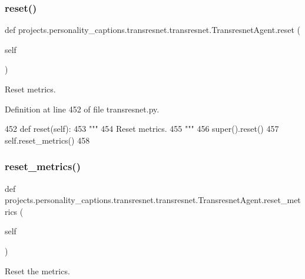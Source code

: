 \subsubsection{\texorpdfstring{reset()}{reset()}}
{\footnotesize\ttfamily def projects.\+personality\+\_\+captions.\+transresnet.\+transresnet.\+Transresnet\+Agent.\+reset (\begin{DoxyParamCaption}\item[{}]{self }\end{DoxyParamCaption})}

\begin{DoxyVerb}Reset metrics.
\end{DoxyVerb}
 

Definition at line 452 of file transresnet.\+py.


\begin{DoxyCode}
452     \textcolor{keyword}{def }reset(self):
453         \textcolor{stringliteral}{"""}
454 \textcolor{stringliteral}{        Reset metrics.}
455 \textcolor{stringliteral}{        """}
456         super().reset()
457         self.reset\_metrics()
458 
\end{DoxyCode}
\mbox{\label{classprojects_1_1personality__captions_1_1transresnet_1_1transresnet_1_1TransresnetAgent_a9940b8a9a9a8ceca55058684e81d3898}} 
\subsubsection{\texorpdfstring{reset\+\_\+metrics()}{reset\_metrics()}}
{\footnotesize\ttfamily def projects.\+personality\+\_\+captions.\+transresnet.\+transresnet.\+Transresnet\+Agent.\+reset\+\_\+metrics (\begin{DoxyParamCaption}\item[{}]{self }\end{DoxyParamCaption})}

\begin{DoxyVerb}Reset the metrics.
\end{DoxyVerb}
 

